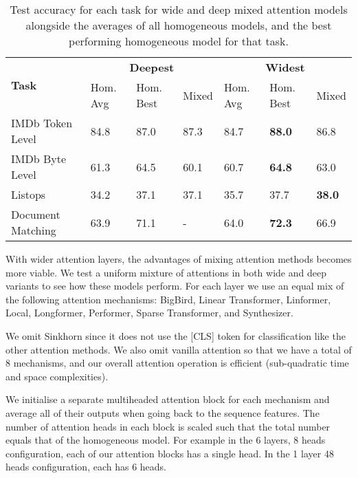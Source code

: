 \begin{table}[htb]
    \caption{Test accuracy for each task for wide and deep mixed attention models alongside the averages of all homogeneous models, and the best performing homogeneous model for that task.}
    \label{table:mixed}
    \begin{center}
        \begin{tabular}{l | l l l | l l l}
            \toprule
            \multirow{2}{*}{\bf Task} & \multicolumn{3}{c}{\bf Deepest} & \multicolumn{3}{c}{\bf Widest} \\
            & Hom. Avg & Hom. Best & Mixed & Hom. Avg & Hom. Best & Mixed \\
            \midrule
            IMDb Token Level & 84.8 & 87.0 & 87.3 & 84.7 & \textbf{88.0} & 86.8 \\
            IMDb Byte Level & 61.3 & 64.5 & 60.1 & 60.7 & \textbf{64.8} & 63.0 \\
            Listops & 34.2 & 37.1 & 37.1 & 35.7 & 37.7 & \textbf{38.0} \\
            Document Matching & 63.9 & 71.1 & - & 64.0 & \textbf{72.3} & 66.9 \\
            \bottomrule
        \end{tabular}
    \end{center}
\end{table}

With wider attention layers, the advantages of mixing attention methods becomes more viable.
We test a uniform mixture of attentions in both wide and deep variants to see how these models perform.
For each layer we use an equal mix of the following attention mechanisms: BigBird, Linear Transformer, Linformer, Local, Longformer, Performer, Sparse Transformer, and Synthesizer.

We omit Sinkhorn since it does not use the [CLS] token for classification like the other attention methods.
We also omit vanilla attention so that we have a total of 8 mechanisms, and our overall attention operation is efficient (sub-quadratic time and space complexities).

We initialise a separate multiheaded attention block for each mechanism and average all of their outputs when going back to the sequence features.
The number of attention heads in each block is scaled such that the total number equals that of the homogeneous model.
For example in the 6 layers, 8 heads configuration, each of our attention blocks has a single head.
In the 1 layer 48 heads configuration, each has 6 heads.

